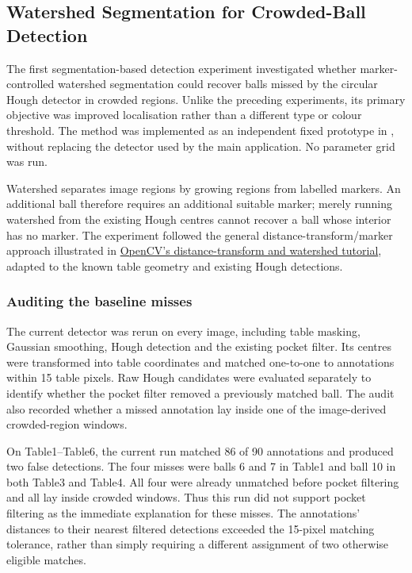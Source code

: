 \subsection{Watershed Segmentation for Crowded-Ball Detection}
\label{sec:watershed-experiment}

The first segmentation-based detection experiment investigated whether marker-controlled watershed
segmentation could recover balls missed by the circular Hough detector in
crowded regions. Unlike the preceding experiments, its primary objective
was improved localisation rather than a different type or colour threshold.
The method was implemented as an independent fixed prototype in
, without replacing the detector
used by the main application. No parameter grid was run.

Watershed separates image regions by growing regions from labelled markers.
An additional ball therefore requires an additional suitable marker; merely
running watershed from the existing Hough centres cannot recover a ball
whose interior has no marker. The experiment followed the general
distance-transform/marker approach illustrated in
\href{https://docs.opencv.org/4.12.0/d2/dbd/tutorial_distance_transform.html}
{OpenCV's distance-transform and watershed tutorial}, adapted to the known
table geometry and existing Hough detections.

\subsubsection{Auditing the baseline misses}

The current detector was rerun on every image, including table masking,
Gaussian smoothing, Hough detection and the existing pocket filter. Its
centres were transformed into table coordinates and matched one-to-one
to annotations within 15 table pixels. Raw Hough candidates were evaluated
separately to identify whether the pocket filter removed a previously
matched ball. The audit also recorded whether a missed annotation lay
inside one of the image-derived crowded-region windows.



On Table1--Table6, the current run matched 86 of 90 annotations and produced
two false detections. The four misses were balls 6 and 7 in Table1 and
ball 10 in both Table3 and Table4. All four were already unmatched before
pocket filtering and all lay inside crowded windows. Thus this run did
not support pocket filtering as the immediate explanation for these misses.
The annotations' distances to their nearest filtered detections exceeded
the 15-pixel matching tolerance, rather than simply requiring a different
assignment of two otherwise eligible matches.

